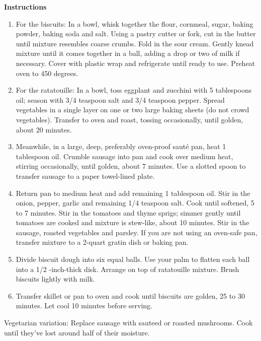 \documentclass{article}
\numberwithin{figure}{section}
\numberwithin{equation}{section}
\begin{document}
{\bf Instructions}
\begin{enumerate}
\item For the biscuits: In a bowl, whisk together the flour, cornmeal, sugar, baking powder, baking soda and salt. Using a pastry cutter or fork, cut in the butter until mixture resembles coarse crumbs. Fold in the sour cream. Gently knead mixture until it comes together in a ball, adding a drop or two of milk if necessary. Cover with plastic wrap and refrigerate until ready to use.  Preheat oven to 450 degrees.
\item For the ratatouille: In a bowl, toss eggplant and zucchini with 5 tablespoons oil; season with 3/4 teaspoon salt and 3/4 teaspoon pepper. Spread vegetables in a single layer on one or two large baking sheets (do not crowd vegetables). Transfer to oven and roast, tossing occasionally, until golden, about 20 minutes.
\item Meanwhile, in a large, deep, preferably oven-proof sauté pan, heat 1 tablespoon oil. Crumble sausage into pan and cook over medium heat, stirring occasionally, until golden, about 7 minutes. Use a slotted spoon to transfer sausage to a paper towel-lined plate.
\item Return pan to medium heat and add remaining 1 tablespoon oil. Stir in the onion, pepper, garlic and remaining 1/4 teaspoon salt. Cook until softened, 5 to 7 minutes. Stir in the tomatoes and thyme sprigs; simmer gently until tomatoes are cooked and mixture is stew-like, about 10 minutes. Stir in the sausage, roasted vegetables and parsley. If you are not using an oven-safe pan, transfer mixture to a 2-quart gratin dish or baking pan.
\item Divide biscuit dough into six equal balls. Use your palm to flatten each ball into a 1/2 -inch-thick disk. Arrange on top of ratatouille mixture. Brush biscuits lightly with milk.
\item Transfer skillet or pan to oven and cook until biscuits are golden, 25 to 30 minutes. Let cool 10 minutes before serving.
\end{enumerate}

Vegetarian variation: Replace sausage with sauteed or roasted mushrooms. Cook until they've lost around half of their moisture.\\

\pagebreak
\end{document}
